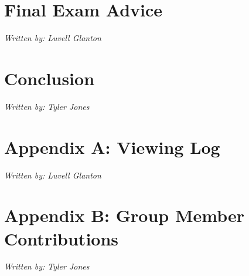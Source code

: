 \documentclass[12pt]{article}
\begin{document}
\newpage
\section{Final Exam Advice}
\begin{center}
    \textit{Written by: Luvell Glanton}
\end{center}
\vspace{1em}

\newpage
\section{Conclusion}
\begin{center}
    \textit{Written by: Tyler Jones}
\end{center}
\vspace{1em}

\newpage
\section{Appendix A: Viewing Log}
\begin{center}
    \textit{Written by: Luvell Glanton}
\end{center}
\vspace{1em}

\newpage
\section{Appendix B: Group Member Contributions}
\begin{center}
    \textit{Written by: Tyler Jones}
\end{center}
\vspace{1em}
\end{document}
